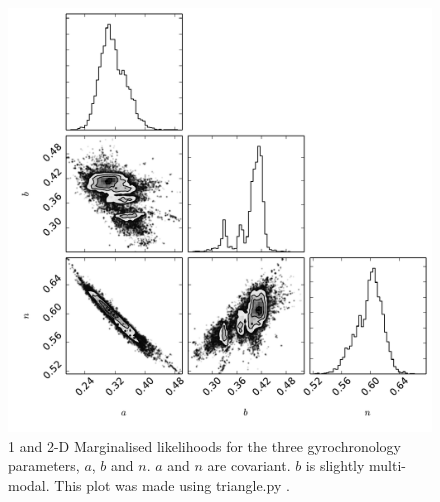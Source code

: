 \documentclass[11pt,preprint]{aastex}
\begin{document}
\begin{figure}[ht]
\begin{center}
\includegraphics[width=6in, clip=true, trim=0 0 0.5in 0]{small_triangleACHF45.pdf}
\caption{1 and 2-D Marginalised likelihoods for the three gyrochronology
parameters, $a$, $b$ and $n$. $a$ and $n$ are covariant. $b$ is slightly
multi-modal. This plot was made using triangle.py
\citep{Foreman-Mackey_triangle}.}
\label{fig:triangle}
\end{center}
\end{figure}
\end{document}
